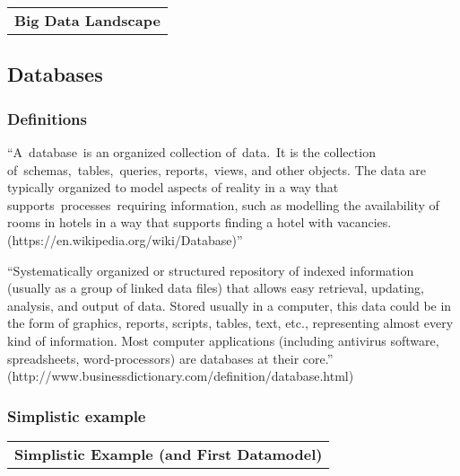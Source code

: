 \documentclass[11pt]{article}
\begin{document}
\begin{longtable}[]{@{}c@{}}
\toprule
\tabularnewline
\midrule
\endhead
\textbf{Big Data Landscape}\tabularnewline
\bottomrule
\end{longtable}

    \subsection{Databases}\label{databases}

\subsubsection{Definitions}\label{definitions}

``A~database~is an organized collection of~data.~It is the collection
of~schemas,~tables,~queries, reports,~views, and other objects. The data
are typically organized to model aspects of reality in a way that
supports~processes~requiring information, such as modelling the
availability of rooms in hotels in a way that supports finding a hotel
with vacancies. (https://en.wikipedia.org/wiki/Database)''

``Systematically organized or structured repository of indexed
information (usually as a group of linked data files) that allows easy
retrieval, updating, analysis, and output of data. Stored usually in a
computer, this data could be in the form of graphics, reports, scripts,
tables, text, etc., representing almost every kind of information. Most
computer applications (including antivirus software, spreadsheets,
word-processors) are databases at their core.''
(http://www.businessdictionary.com/definition/database.html)

\subsubsection{Simplistic example}\label{simplistic-example}

\begin{longtable}[]{@{}c@{}}
\toprule
\tabularnewline
\midrule
\endhead
\textbf{Simplistic Example (and First Datamodel)}\tabularnewline
\bottomrule
\end{longtable}
\end{document}

